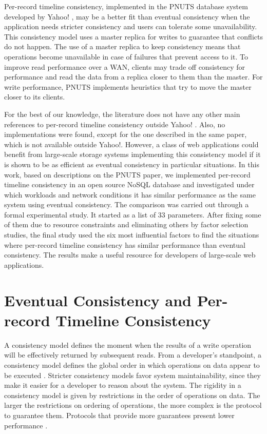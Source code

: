 \documentclass[man,floatsintext,12pt]{apa6}
\begin{document}
Per-record timeline consistency, implemented in the PNUTS database system
developed by Yahoo! \parencite{Cooper2008}, may be a better fit than eventual
consistency when the application needs stricter consistency and users can
tolerate some unavailability. This consistency model uses a master replica for
writes to guarantee that conflicts do not happen. The use of a master replica
to keep consistency means that operations become unavailable in case of
failures that prevent access to it. To improve read performance over a WAN,
clients may trade off consistency for performance and read the data from a
replica closer to them than the master. For write performance, PNUTS implements
heuristics that try to move the master closer to its clients.

For the best of our knowledge, the literature does not have any other main
references to per-record timeline consistency outside Yahoo!
\parencite{Cooper2008,Kadambi2011,Ramakrishnan2012,Silberstein2012}. Also, no
implementations were found, except for the one described in the same paper,
which is not available outside Yahoo!.  However, a class of web applications
could benefit from large-scale storage systems implementing this consistency
model if it is shown to be as efficient as eventual consistency in particular
situations. In this work, based on descriptions on the PNUTS paper, we
implemented per-record timeline consistency in an open source NoSQL database
and investigated under which workloads and network conditions it has similar
performance as the same system using eventual consistency. The comparison was
carried out through a formal experimental study. It started as a list of 33
parameters. After fixing some of them due to resource constraints and
eliminating others by factor selection studies, the final study used the six
most influential factors to find the situations where per-record timeline
consistency has similar performance than eventual consistency. The results make
a useful resource for developers of large-scale web applications.

\section{Eventual Consistency and Per-record Timeline Consistency}

A consistency model defines the moment when the results of a write operation
will be effectively returned by subsequent reads. From a developer's
standpoint, a consistency model defines the global order in which operations on
data appear to be executed \parencite{Adve1995}. Stricter consistency models
favor system maintainability, since they make it easier for a developer to
reason about the system. The rigidity in a consistency model is given by
restrictions in the order of operations on data. The larger the restrictions on
ordering of operations, the more complex is the protocol to guarantee them.
Protocols that provide more guarantees present lower performance
\parencite{Mosberger1993}.
\end{document}
